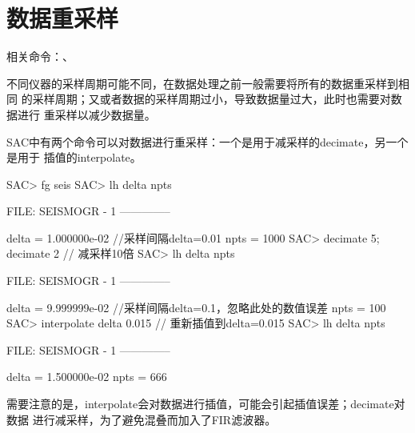 \section{数据重采样}
相关命令：、

不同仪器的采样周期可能不同，在数据处理之前一般需要将所有的数据重采样到相同
的采样周期；又或者数据的采样周期过小，导致数据量过大，此时也需要对数据进行
重采样以减少数据量。

SAC中有两个命令可以对数据进行重采样：一个是用于减采样的decimate，另一个是用于
插值的interpolate。

\begin{SACCode}
SAC> fg seis
SAC> lh delta npts
  
  FILE: SEISMOGR - 1
 --------------

     delta = 1.000000e-02       //采样间隔delta=0.01
      npts = 1000
SAC> decimate 5; decimate 2     // 减采样10倍
SAC> lh delta npts
  
  FILE: SEISMOGR - 1
 --------------

     delta = 9.999999e-02       //采样间隔delta=0.1，忽略此处的数值误差
      npts = 100
SAC> interpolate delta 0.015    // 重新插值到delta=0.015
SAC> lh delta npts
  
  FILE: SEISMOGR - 1
 --------------

     delta = 1.500000e-02
      npts = 666
\end{SACCode}

需要注意的是，interpolate会对数据进行插值，可能会引起插值误差；decimate对数据
进行减采样，为了避免混叠而加入了FIR滤波器。

